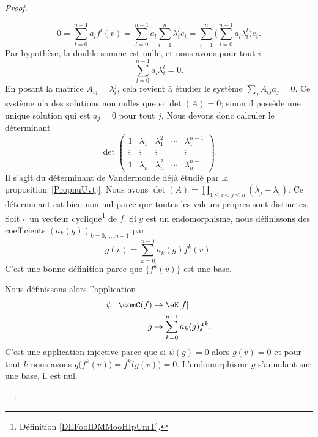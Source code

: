 \begin{proof}
\begin{subproof}
\begin{equation}
			0=\sum_{l=0}^{n-1}a_lf^l(v)=\sum_{l=0}^{n-1}a_l\sum_{i=1}^n\lambda_i^le_i=\sum_{i=1}^n\Big( \sum_{l=0}^{n-1}a_l\lambda_i^l \Big)e_i.
		\end{equation}
		Par hypothèse, la double somme est nulle, et nous avons pour tout \( i\) :
		\begin{equation}
			\sum_{l=0}^{n-1}a_l\lambda_i^l=0.
		\end{equation}
		En posant la matrice \( A_{ij}=\lambda_i^j\), cela revient à étudier le système \( \sum_j A_{ij}a_j=0\). Ce système n'a des solutions non nulles que si \( \det(A)= 0\); sinon il possède une unique solution qui est \( a_j=0\) pour tout \( j\). Nous devons donc calculer le déterminant
		\begin{equation}
			\det\begin{pmatrix}
				1      & \lambda_1 & \lambda_1^2 & \cdots & \lambda_1^{n-1} \\
				\vdots & \vdots    & \vdots      &        & \vdots          \\
				1      & \lambda_n & \lambda_n^2 & \cdots & \lambda_n^{n-1}
			\end{pmatrix}.
		\end{equation}
		Il s'agit du déterminant de Vandermonde déjà étudié par la proposition~\ref{PropnuUvtj}. Nous avons \( \det(A)=\prod_{1\leq i<j\leq n}(\lambda_j-\lambda_i)\). Ce déterminant est bien non nul parce que toutes les valeurs propres sont distinctes.
		Soit \( v\) un vecteur cyclique\footnote{Définition \ref{DEFooIDMMooHIpUmT}.} de \( f\). Si \( g\) est un endomorphisme, nous définissons des coefficients \( (a_k(g))_{k=0,\ldots, n-1}\) par
		\begin{equation}
			g(v)=\sum_{k=0}^{n-1}a_k(g)f^k(v).
		\end{equation}
		C'est une bonne définition parce que \( \{ f^k(v) \} \) est une base.

		Nous définissons alors l'application
		\begin{equation}
			\begin{aligned}
				\psi\colon \comC(f) & \to \eK[f]                         \\
				g                   & \mapsto \sum_{k=0}^{n-1}a_k(g)f^k.
			\end{aligned}
		\end{equation}
		C'est une application injective parce que si \( \psi(g)=0\) alors \( g(v)=0\) et pour tout \( k\) nous avons \( g\big( f^k(v) \big)=f^k\big( g(v) \big)=0\). L'endomorphisme \( g\) s'annulant sur une base, il est nul.


\end{subproof}
\end{proof}
